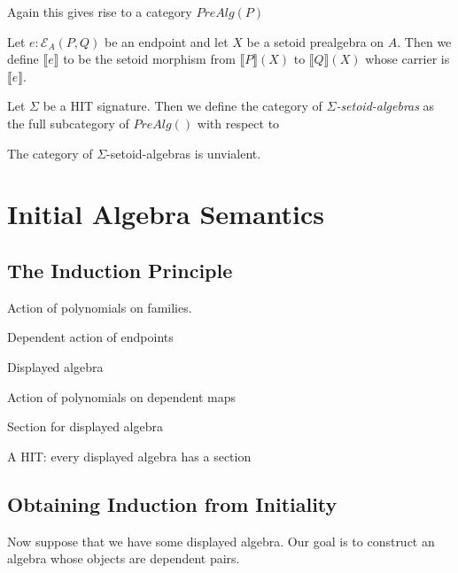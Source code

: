 \documentclass[9pt]{entcs}
\newcommand{\category}[1]{#1}
\newcommand{\1}{\type{1}} %
\newcommand{\ep}[3]{\mathcal{E}_{#1}(#2,#3)} %
\newcommand{\semP}[1]{\llbracket #1 \rrbracket} %
\newcommand{\prealg}[1]{\category{PreAlg}(#1)} %
\newcommand{\semE}[1]{\llbracket #1 \rrbracket} %
\begin{document}
Again this gives rise to a category $\prealg{P}$

\begin{definition}
Let $e : \ep{A}{P}{Q}$ be an endpoint and let $X$ be a setoid prealgebra on $A$.
Then we define $\semE{e}$ to be the setoid morphism from $\semE{P}(X)$ to $\semE{Q}(X)$ whose carrier is $\semP{e}$.
\end{definition}

\begin{definition}
Let $\Sigma$ be a HIT signature.
Then we define the category of \emph{$\Sigma$-setoid-algebras} as the full subcategory of $\prealg{}$ with respect to
\end{definition}

\begin{proposition}
The category of $\Sigma$-setoid-algebras is unvialent.
\end{proposition}

\section{Initial Algebra Semantics}

\subsection{The Induction Principle}

\begin{definition}
Action of polynomials on families.
\end{definition}

\begin{definition}
Dependent action of endpoints
\end{definition}

\begin{definition}
Displayed algebra
\end{definition}

\begin{definition}
Action of polynomials on dependent maps
\end{definition}

\begin{definition}
Section for displayed algebra
\end{definition}

\begin{definition}
A HIT: every displayed algebra has a section
\end{definition}

\subsection{Obtaining Induction from Initiality}
Now suppose that we have some displayed algebra.
Our goal is to construct an algebra whose objects are dependent pairs.
\end{document}
